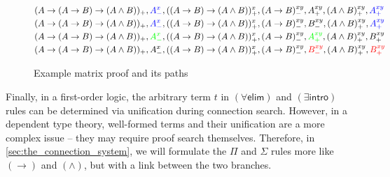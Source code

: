 \documentclass[twoside]{report}
\begin{document}
\begin{figure}[ht]
    \centering
    \vspace{1em}
    \vspace{1em}
    \begin{framed}
    $$
    \begin{aligned}
        & (A \to (A \to B) \to (A \land B))_+,
        \textcolor{blue}{A^x_-},
        ((A \to B) \to (A \land B))^x_+,
        (A \to B)^{xy}_-,
        A^{xy}_+,
        (A \land B)^{xy}_+,
        \textcolor{blue}{A^{xy}_+}
        \\
        & (A \to (A \to B) \to (A \land B))_+,
        \textcolor{blue}{A^x_-},
        ((A \to B) \to (A \land B))^x_+,
        (A \to B)^{xy}_-,
        B^{xy}_-,
        (A \land B)^{xy}_+,
        \textcolor{blue}{A^{xy}_+}
        \\
        & (A \to (A \to B) \to (A \land B))_+,
        \textcolor{green}{A^x_-},
        ((A \to B) \to (A \land B))^x_+,
        (A \to B)^{xy}_-,
        \textcolor{green}{A^{xy}_+},
        (A \land B)^{xy}_+,
        B^{xy}_+
        \\
        & (A \to (A \to B) \to (A \land B))_+,
        A^x_-,
        ((A \to B) \to (A \land B))^x_+,
        (A \to B)^{xy}_-,
        \textcolor{red}{B^{xy}_-},
        (A \land B)^{xy}_+,
        \textcolor{red}{B^{xy}_+}
        \\
    \end{aligned}
    $$
    \end{framed}
\caption{Example matrix proof and its paths}
\label{fig:example_matrix}
\end{figure}

Finally, in a first-order logic, the arbitrary term $t$ in $({\forall}\mathsf{elim})$ and $({\exists}\mathsf{intro})$ rules can be determined via unification during connection search. However, in a dependent type theory, well-formed terms and their unification are a more complex issue -- they may require proof search themselves. Therefore, in \cref{sec:the_connection_system}, we will formulate the $\Pi$ and $\Sigma$ rules more like $(\to)$ and $(\land)$, but with a link between the two branches.
\end{document}
